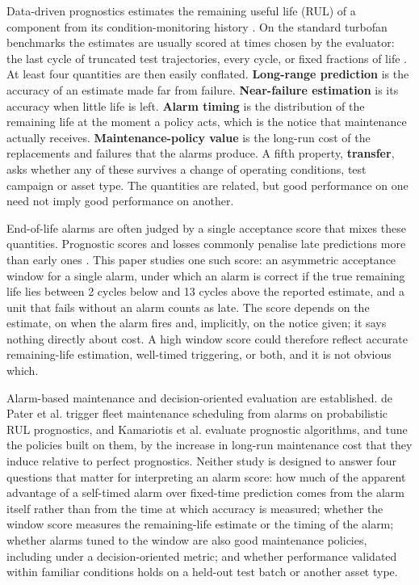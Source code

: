 \documentclass[a4paper,fleqn,doubleblind]{cas-dc}
\begin{document}
Data-driven prognostics estimates the remaining useful life (RUL) of a component from its condition-monitoring history \cite{lei2018,si2011}. On the standard turbofan benchmarks the estimates are usually scored at times chosen by the evaluator: the last cycle of truncated test trajectories, every cycle, or fixed fractions of life \cite{ramasso2014}. At least four quantities are then easily conflated. \textbf{Long-range prediction} is the accuracy of an estimate made far from failure. \textbf{Near-failure estimation} is its accuracy when little life is left. \textbf{Alarm timing} is the distribution of the remaining life at the moment a policy acts, which is the notice that maintenance actually receives. \textbf{Maintenance-policy value} is the long-run cost of the replacements and failures that the alarms produce. A fifth property, \textbf{transfer}, asks whether any of these survives a change of operating conditions, test campaign or asset type. The quantities are related, but good performance on one need not imply good performance on another.

End-of-life alarms are often judged by a single acceptance score that mixes these quantities. Prognostic scores and losses commonly penalise late predictions more than early ones \cite{saxena2008,rengasamy2020}. This paper studies one such score: an asymmetric acceptance window for a single alarm, under which an alarm is correct if the true remaining life lies between 2 cycles below and 13 cycles above the reported estimate, and a unit that fails without an alarm counts as late. The score depends on the estimate, on when the alarm fires and, implicitly, on the notice given; it says nothing directly about cost. A high window score could therefore reflect accurate remaining-life estimation, well-timed triggering, or both, and it is not obvious which.

Alarm-based maintenance and decision-oriented evaluation are established. de Pater et al. \cite{depater2022} trigger fleet maintenance scheduling from alarms on probabilistic RUL prognostics, and Kamariotis et al. \cite{kamariotis2024} evaluate prognostic algorithms, and tune the policies built on them, by the increase in long-run maintenance cost that they induce relative to perfect prognostics. Neither study is designed to answer four questions that matter for interpreting an alarm score: how much of the apparent advantage of a self-timed alarm over fixed-time prediction comes from the alarm itself rather than from the time at which accuracy is measured; whether the window score measures the remaining-life estimate or the timing of the alarm; whether alarms tuned to the window are also good maintenance policies, including under a decision-oriented metric; and whether performance validated within familiar conditions holds on a held-out test batch or another asset type.
\end{document}
